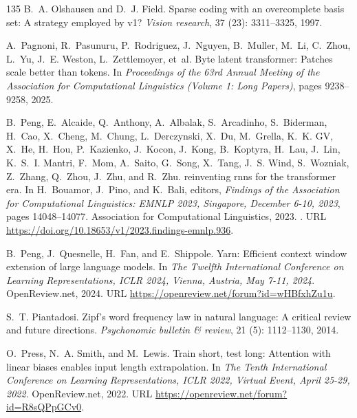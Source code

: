 \begin{thebibliography}{135}
B.~A. Olshausen and D.~J. Field.
\newblock Sparse coding with an overcomplete basis set: A strategy employed by
  v1?
\newblock \emph{Vision research}, 37 (23): 3311--3325, 1997.

A.~Pagnoni, R.~Pasunuru, P.~Rodriguez, J.~Nguyen, B.~Muller, M.~Li, C.~Zhou,
  L.~Yu, J.~E. Weston, L.~Zettlemoyer, et~al.
\newblock Byte latent transformer: Patches scale better than tokens.
\newblock In \emph{Proceedings of the 63rd Annual Meeting of the Association
  for Computational Linguistics (Volume 1: Long Papers)}, pages 9238--9258,
  2025.

B.~Peng, E.~Alcaide, Q.~Anthony, A.~Albalak, S.~Arcadinho, S.~Biderman, H.~Cao,
  X.~Cheng, M.~Chung, L.~Derczynski, X.~Du, M.~Grella, K.~K. GV, X.~He, H.~Hou,
  P.~Kazienko, J.~Kocon, J.~Kong, B.~Koptyra, H.~Lau, J.~Lin, K.~S.~I. Mantri,
  F.~Mom, A.~Saito, G.~Song, X.~Tang, J.~S. Wind, S.~Wozniak, Z.~Zhang,
  Q.~Zhou, J.~Zhu, and R.~Zhu.
 reinventing rnns for the transformer era.
\newblock In H.~Bouamor, J.~Pino, and K.~Bali, editors, \emph{Findings of the
  Association for Computational Linguistics: {EMNLP} 2023, Singapore, December
  6-10, 2023}, pages 14048--14077. Association for Computational Linguistics,
  2023.
\newblock {}.
\newblock URL \url{https://doi.org/10.18653/v1/2023.findings-emnlp.936}.

B.~Peng, J.~Quesnelle, H.~Fan, and E.~Shippole.
\newblock Yarn: Efficient context window extension of large language models.
\newblock In \emph{The Twelfth International Conference on Learning
  Representations, {ICLR} 2024, Vienna, Austria, May 7-11, 2024}.
  OpenReview.net, 2024.
\newblock URL \url{https://openreview.net/forum?id=wHBfxhZu1u}.

S.~T. Piantadosi.
\newblock Zipf’s word frequency law in natural language: A critical review
  and future directions.
\newblock \emph{Psychonomic bulletin \& review}, 21 (5):
  1112--1130, 2014.

O.~Press, N.~A. Smith, and M.~Lewis.
\newblock Train short, test long: Attention with linear biases enables input
  length extrapolation.
\newblock In \emph{The Tenth International Conference on Learning
  Representations, {ICLR} 2022, Virtual Event, April 25-29, 2022}.
  OpenReview.net, 2022.
\newblock URL \url{https://openreview.net/forum?id=R8sQPpGCv0}.


\end{thebibliography}
